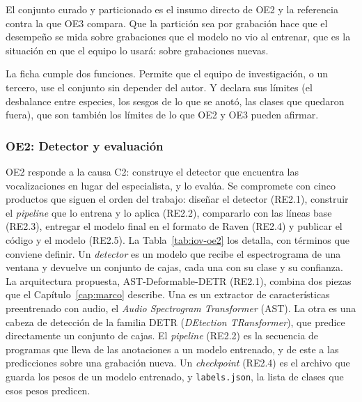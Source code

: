  El conjunto curado y particionado es el insumo directo
de OE2 y la referencia contra la que OE3 compara. Que la partición sea por
grabación hace que el desempeño se mida sobre grabaciones que el modelo no vio al
entrenar, que es la situación en que el equipo lo usará: sobre grabaciones
nuevas.

 La ficha cumple dos funciones. Permite que el equipo de
investigación, o un tercero, use el conjunto sin depender del autor. Y declara sus
límites (el desbalance entre especies, los sesgos de lo que se anotó, las clases
que quedaron fuera), que son también los límites de lo que OE2 y OE3 pueden
afirmar.

\subsubsection{OE2: Detector y evaluación}

OE2 responde a la causa C2: construye el detector que encuentra las
vocalizaciones en lugar del especialista, y lo evalúa. Se compromete con cinco
productos que siguen el orden del trabajo: diseñar el detector (RE2.1), construir
el \textit{pipeline} que lo entrena y lo aplica (RE2.2), compararlo con las líneas
base (RE2.3), entregar el modelo final en el formato de Raven (RE2.4) y publicar
el código y el modelo (RE2.5). La Tabla~\ref{tab:iov-oe2} los detalla, con
términos que conviene definir. Un \emph{detector} es un modelo que recibe el
espectrograma de una ventana y devuelve un conjunto de cajas, cada una con su
clase y su confianza. La arquitectura propuesta, AST-Deformable-DETR (RE2.1),
combina dos piezas que el Capítulo~\ref{cap:marco} describe. Una es un extractor
de características preentrenado con audio, el \textit{Audio Spectrogram
Transformer} (AST). La otra es una cabeza de detección de la familia DETR
(\textit{DEtection TRansformer}), que predice directamente un conjunto de cajas.
El \textit{pipeline} (RE2.2) es la secuencia de programas que lleva de las
anotaciones a un modelo entrenado, y de este a las predicciones sobre una
grabación nueva. Un \textit{checkpoint} (RE2.4) es el archivo que guarda los pesos
de un modelo entrenado, y \texttt{labels.json}, la lista de clases que esos pesos
predicen.

